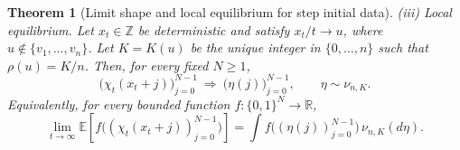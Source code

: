 \documentclass[10pt,a4paper]{amsart}
\newtheorem{theorem}{Theorem}
\newcommand{\Ee}{\mathbb E}
\newcommand{\R}{\mathbb R}
\newcommand{\Z}{\mathbb Z}
\begin{document}
\begin{theorem}[Limit shape and local equilibrium for step initial data]
		\smallskip
		\noindent\emph{(iii) Local equilibrium.}
		Let $x_t\in\Z$ be deterministic and satisfy $x_t/t\to u$, where
		$u\notin\{v_1,\ldots,v_n\}$.  Let $K=K(u)$ be the unique integer in
		$\{0,\ldots,n\}$ such that $\rho(u)=K/n$.  Then, for every fixed
		$N\ge1$,
		\begin{equation}\label{eq:local-equilibrium}
			\bigl(\chi_t(x_t+j)\bigr)_{j=0}^{N-1}
			\ \Longrightarrow\ 
			\bigl(\eta(j)\bigr)_{j=0}^{N-1},
			\qquad \eta\sim\nu_{n,K}.
		\end{equation}
		Equivalently, for every bounded function $f:\{0,1\}^N\to\R$,
		\begin{equation}\label{eq:local-equilibrium-test-functions}
			\lim_{t\to\infty}
			\Ee\left[f\bigl((\chi_t(x_t+j))_{j=0}^{N-1}\bigr)\right]
			=\int f\bigl((\eta(j))_{j=0}^{N-1}\bigr)\,\nu_{n,K}(d\eta).
		\end{equation}
	\end{theorem}
\end{document}
